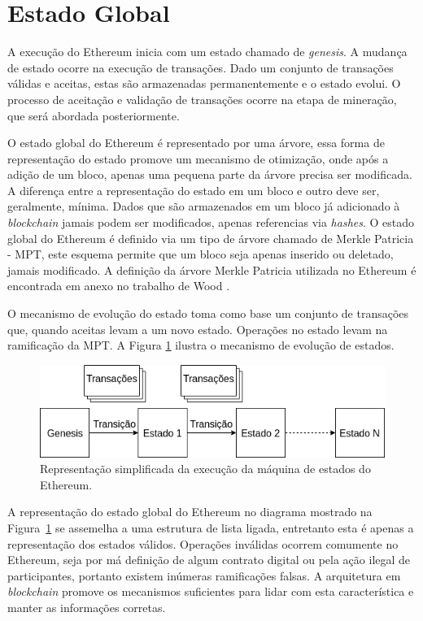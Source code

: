 \documentclass[tcc,capa]{texufpel}
\begin{document}
	\section{Estado Global}\label{ssc:estado-global}
	
	A execução do Ethereum inicia com um estado chamado de \textit{genesis}. A mudança de estado ocorre na execução de transações. Dado um conjunto de transações válidas e aceitas, estas são armazenadas permanentemente e o estado evolui. O processo de aceitação e validação de transações ocorre na etapa de mineração, que será abordada posteriormente.

	O estado global do Ethereum é representado por uma árvore, essa forma de representação do estado promove um mecanismo de otimização, onde após a adição de um bloco, apenas uma pequena parte da árvore precisa ser modificada. A diferença entre a representação do estado em um bloco e outro deve ser, geralmente, mínima. Dados que são armazenados em um bloco já adicionado à \textit{blockchain} jamais podem ser modificados, apenas referencias via \textit{hashes}. O estado global do Ethereum é definido via um tipo de árvore chamado de Merkle Patricia - MPT, este esquema permite que um bloco seja apenas inserido ou deletado, jamais modificado. A definição da árvore Merkle Patricia utilizada no Ethereum é encontrada em anexo no trabalho de  Wood \cite{wood2014ethereum}.
	
	O mecanismo de evolução do estado toma como base um conjunto de transações que, quando aceitas levam a um novo estado. Operações no estado levam na ramificação da MPT. A Figura \ref{fig:estado-global-ethereum} ilustra o mecanismo de evolução de estados. 
	
	\begin{figure}
        \centering
        \includegraphics[width=15cm]{imagens/estado-global-ethereum.png}
        \caption{Representação simplificada da execução da máquina de estados do Ethereum.}
        \label{fig:estado-global-ethereum}
    \end{figure}
    
    A representação do estado global do Ethereum no diagrama mostrado na Figura~\ref{fig:estado-global-ethereum} se assemelha a uma estrutura de lista ligada, entretanto esta é apenas a representação dos estados válidos. Operações inválidas ocorrem comumente no Ethereum, seja por má definição de algum contrato digital ou pela ação ilegal de participantes, portanto existem inúmeras ramificações falsas. A arquitetura em \textit{blockchain} promove os mecanismos suficientes para lidar com esta característica e manter as informações corretas.
\end{document}
